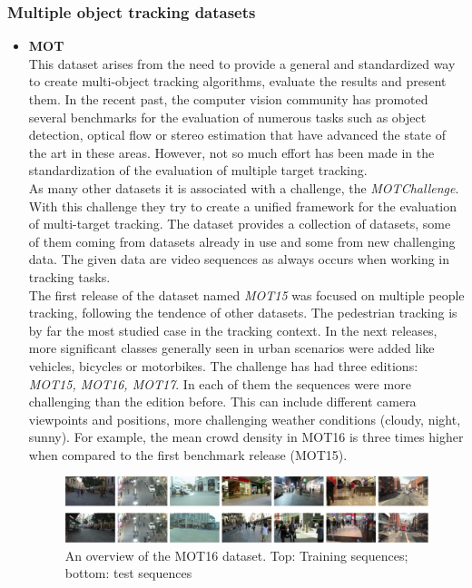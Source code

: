 \subsubsection{Multiple object tracking datasets}
\begin{itemize}
\item \textbf{MOT} ~\cite{milan2016mot16}\\
This dataset arises from the need to provide a general and standardized way to create multi-object tracking algorithms, evaluate the results and present them. In the recent past, the computer vision community has promoted several benchmarks for the evaluation of numerous tasks such as object detection, optical flow or stereo estimation that have advanced the state of the art in these areas. However, not so much effort has been made in the standardization of the evaluation of multiple target tracking.\\
As many other datasets it is associated with a challenge, the \textit{MOTChallenge}. With this challenge they try to create a unified framework for the evaluation of multi-target tracking. The dataset provides a collection of datasets, some of them coming from datasets already in use and some from new challenging data. The given data are video sequences as always occurs when working in tracking tasks.\\
The first release of the dataset named \textit{MOT15} was focused on multiple people tracking, following the tendence of other datasets. The pedestrian tracking is by far the most studied case in the tracking context. In the next releases, more significant classes generally seen in urban scenarios were added like vehicles, bicycles or motorbikes. The challenge has had three editions: \textit{MOT15, MOT16, MOT17}. In each of them the sequences were more challenging than the edition before. This can include different camera viewpoints and positions, more challenging weather conditions (cloudy, night, sunny). For example, the mean crowd density in MOT16 is three times higher when compared to the first benchmark release (MOT15).
\begin{figure}[H]
\begin{center}
\includegraphics[scale=0.4]{previous_version/mot16.png}
\caption{An overview of the MOT16 dataset. Top: Training sequences; bottom: test sequences ~\cite{milan2016mot16}}

\end{center}
\end{figure}
\end{itemize}
